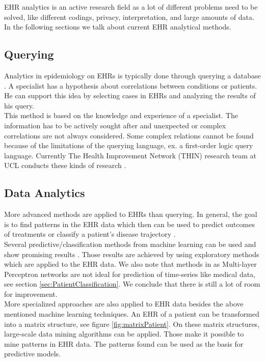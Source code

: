 EHR analytics is an active research field as a lot of different problems need to be solved, like different codings, privacy, interpretation, and large amounts of data. In the following sections we talk about current EHR analytical methods.


\subsection{Querying}

Analytics in epidemiology on EHRs is typically done through querying a database \cite{EHRquery:journal}. A specialist has a hypothesis about correlations between conditions or patients. He can support this idea by selecting cases in EHRs and analyzing the results of his query. \\
This method is based on the knowledge and experience of a specialist. The information has to be actively sought after and unexpected or complex correlations are not always considered. Some complex relations cannot be found because of the limitations of the querying language, ex. a first-order logic query language. Currently The Health Improvement Network (THIN) research team at UCL conducts these kinds of research \cite{THIN:online}.

\subsection{Data Analytics}

More advanced methods are applied to EHRs than querying. In general, the goal is to find patterns in the EHR data which then can be used to predict outcomes of treatments or classify a patient's disease trajectory \cite{EHRbigdata:slides}. \\

Several predictive/classification methods from machine learning can be used and show promising results \cite{EHRmining:article}. Those results are achieved by using exploratory methods which are applied to the EHR data. We also note that methods in \cite{EHRmining:article} as Multi-layer Perceptron networks are not ideal for prediction of time-series like medical data, see section \ref{sec:PatientClassification}. We conclude that there is still a lot of room for improvement. \\
 
More specialized approaches are also applied to EHR data \cite{EHRrecommender:article} besides the above mentioned machine learning techniques. 
An EHR of a patient can be transformed into a matrix structure, see figure \ref{fig:matrixPatient}. On these matrix structures, large-scale data mining algorithms can be applied. Those make it possible to mine patterns in EHR data. The patterns found can be used as the basis for predictive models.

